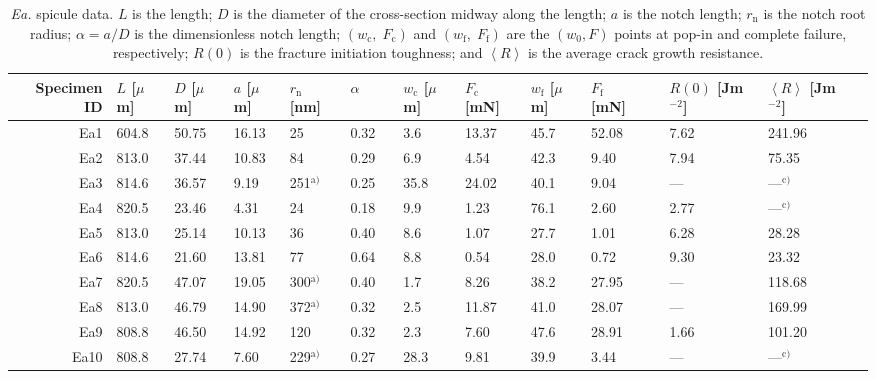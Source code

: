 \documentclass[12pt,onecolumn]{article}
\makeatletter
\newcommand{\EA}{\textit{Ea.\@}\xspace}
\newcommand{\ra}[1]{\renewcommand{\arraystretch}{#1}}
\makeatother
\begin{document}
\begin{bibunit}
\begin{table}
{\scriptsize
\centering
\caption{\EA spicule data. $L$ is the length; $D$ is the diameter of the cross-section midway along the length; $a$ is the notch length; $r_\mathrm{n}$ is the notch root radius; $\alpha=a/D$ is the dimensionless notch length; $(w_\mathrm{c},\;F_\mathrm{c})$ and $(w_\mathrm{f},\;F_\mathrm{f})$ are the $(w_0,F)$ points at pop-in and complete failure, respectively; $R(0)$ is the fracture initiation toughness; and $\left< R \right>$ is the average crack growth resistance.}
\label{tab:EAdata}
\ra{1.25}
\begin{threeparttable}[t]
\begin{tabular}{rllllllllllllll}
\toprule
Specimen ID & $L$ [$\mu$m] & $D$ [$\mu$m] & $a$ [$\mu$m] & $r_\mathrm{n}$ [nm] & $\alpha$ & & $w_\mathrm{c}$ [$\mu$m] & $F_\mathrm{c}$ [mN] & $w_\mathrm{f}$ [$\mu$m] & $F_\mathrm{f}$ [mN] & & $R(0)$ [Jm$^{-2}$] & $\left< R \right>$ [Jm$^{-2}$] \\
\midrule
Ea1 & 604.8 & 50.75 & 16.13 &   25 & 0.32 &  &  3.6 & 13.37 & 45.7 & 52.08 &  & 7.62 &241.96 \\ 
Ea2 & 813.0 & 37.44 & 10.83 &   84 & 0.29 &  &  6.9 & 4.54 & 42.3 & 9.40 &  & 7.94 &75.35 \\ 
Ea3 & 814.6 & 36.57 & 9.19 &  251$^\text{a)}$ & 0.25 &  & 35.8 & 24.02 & 40.1 & 9.04 &  & --- &---$^\text{c)}$\\ 
Ea4 & 820.5 & 23.46 & 4.31 &   24 & 0.18 &  &  9.9 & 1.23 & 76.1 & 2.60 &  & 2.77 &---$^\text{c)}$\\ 
Ea5 & 813.0 & 25.14 & 10.13 &   36 & 0.40 &  &  8.6 & 1.07 & 27.7 & 1.01 &  & 6.28 &28.28 \\ 
Ea6 & 814.6 & 21.60 & 13.81 &   77 & 0.64 &  &  8.8 & 0.54 & 28.0 & 0.72 &  & 9.30 &23.32 \\ 
Ea7 & 820.5 & 47.07 & 19.05 &  300$^\text{a)}$ & 0.40 &  &  1.7 & 8.26 & 38.2 & 27.95 &  & --- &118.68 \\ 
Ea8 & 813.0 & 46.79 & 14.90 &  372$^\text{a)}$ & 0.32 &  &  2.5 & 11.87 & 41.0 & 28.07 &  & --- &169.99 \\ 
Ea9 & 808.8 & 46.50 & 14.92 &  120 & 0.32 &  &  2.3 & 7.60 & 47.6 & 28.91 &  & 1.66 &101.20 \\ 
Ea10 & 808.8 & 27.74 & 7.60 &  229$^\text{a)}$ & 0.27 &  & 28.3 & 9.81 & 39.9 & 3.44 &  & --- &---$^\text{c)}$\\ 

\end{tabular}
\end{threeparttable}}
\end{table}
\end{bibunit}
\end{document}
